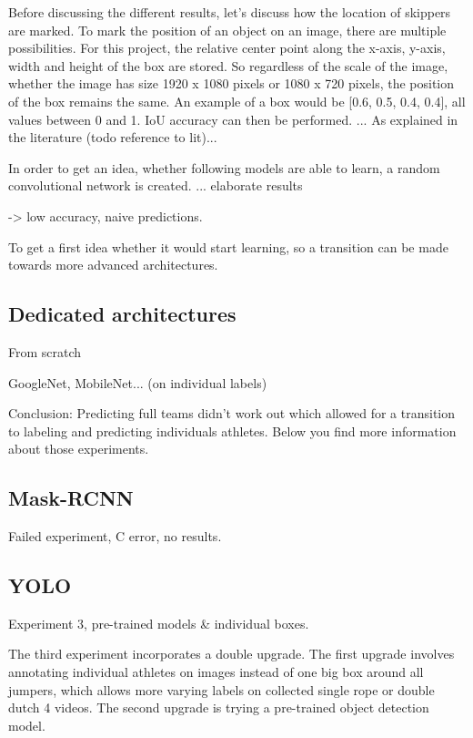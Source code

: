 
Before discussing the different results, let's discuss how the location of skippers are marked. To mark the position of an object on an image, there are multiple possibilities.
For this project, the relative center point along the x-axis, y-axis, width and height of the box are stored. So regardless of the scale of the image, whether the image has size 1920 x 1080 pixels or 1080 x 720 pixels, the position of the box remains the same.
An example of a box would be [0.6, 0.5, 0.4, 0.4], all values between 0 and 1. IoU accuracy can then be performed.
... As explained in the literature (todo reference to lit)...

In order to get an idea, whether following models are able to learn, a random convolutional network is created.
... elaborate results %

-> low accuracy, naive predictions.

To get a first idea whether it would start learning, so a transition can be made towards more advanced architectures.

\subsection{Dedicated architectures}

From scratch

GoogleNet, MobileNet... (on individual labels)

Conclusion:
Predicting full teams didn't work out which allowed for a transition to labeling and predicting individuals athletes. Below you find more information about those experiments.

\subsection{Mask-RCNN}
Failed experiment, C error, no results.

\subsection{YOLO}

Experiment 3, pre-trained models \& individual boxes.

The third experiment incorporates a double upgrade. The first upgrade involves annotating individual athletes on images instead of one big box around all jumpers, which allows more varying labels on collected single rope or double dutch 4 videos. The second upgrade is trying a pre-trained object detection model.

